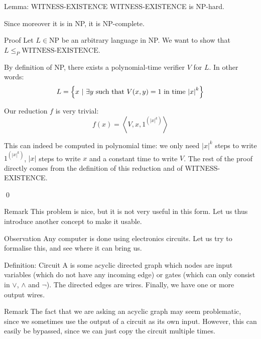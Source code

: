 \documentclass[a4paper]{article}
\begin{document}
\begin{parag}{Lemma: WITNESS-EXISTENCE}
    WITNESS-EXISTENCE is NP-hard.

    Since moreover it is in NP, it is NP-complete.

    \begin{subparag}{Proof}
        Let $L \in \text{NP}$ be an arbitrary language in NP. We want to show that $L \leq_P \text{WITNESS-EXISTENCE}$.

        By definition of NP, there exists a polynomial-time verifier $V$ for $L$. In other words: 
        \[L = \left\{x \suchthat \exists y \text{ such that } V\left(x, y\right) = 1 \text{ in time $\left|x\right|^k$}\right\}\]
        
        Our reduction $f$ is very trivial: 
        \[f\left(x\right) = \left\langle V, x, 1^{\left(\left|x\right|^k\right)} \right\rangle\]
        
        This can indeed be computed in polynomial time: we only need $\left|x\right|^k$ steps to write $1^{\left(\left|x\right|^k\right)}$, $\left|x\right|$ steps to write $x$ and a constant time to write $V$. The rest of the proof directly comes from the definition of this reduction and of WITNESS-EXISTENCE.

        \qed
    \end{subparag}

    \begin{subparag}{Remark}
        This problem is nice, but it is not very useful in this form. Let us thus introduce another concept to make it usable.
    \end{subparag}
\end{parag}

\begin{parag}{Observation}
    Any computer is done using electronics circuits. Let us try to formalise this, and see where it can bring us.
\end{parag}

\begin{parag}{Definition: Circuit}
    A  is some acyclic directed graph which nodes are input variables (which do not have any incoming edge) or gates (which can only consist in $\lor$, $\land$ and $\lnot$). The directed edges are wires. Finally, we have one or more output wires.


    \begin{subparag}{Remark}
        The fact that we are asking an acyclic graph may seem problematic, since we sometimes use the output of a circuit as its own input. However, this can easily be bypassed, since we can just copy the circuit multiple times.
    \end{subparag}
\end{parag}
\end{document}
